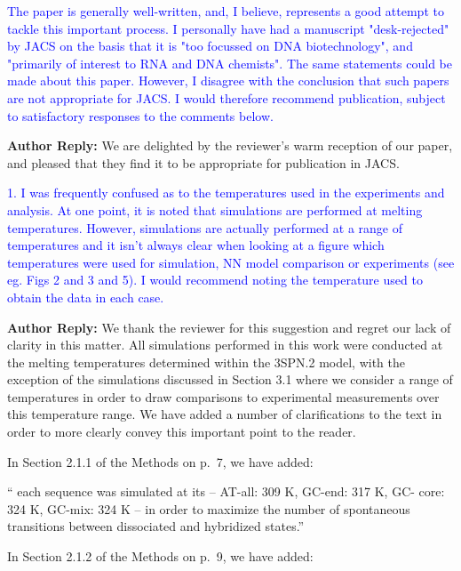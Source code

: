 \documentclass[11pt,a4paper]{letter} %
\newcommand*{\rood}[1]{{\color{red}{#1}}}
\begin{document}
\textcolor{blue}{The paper is generally well-written, and, I believe, represents a good attempt to tackle this important process. I personally have had a manuscript "desk-rejected" by JACS on the basis that it is "too focussed on DNA biotechnology", and "primarily of interest to RNA and DNA chemists". The same statements could be made about this paper. However, I disagree with the conclusion that such papers are not appropriate for JACS. I would therefore recommend publication, subject to satisfactory responses to the comments below.  }

\textbf{Author Reply:}   We are delighted by the reviewer's warm reception of our paper, and pleased that they find it to be appropriate for publication in JACS.



\textcolor{blue}{1.   I was frequently confused as to the temperatures used in the experiments and analysis. At one point, it is noted that simulations are performed at melting temperatures. However, simulations are actually performed at a range of temperatures and it isn't always clear when looking at a figure which temperatures were used for simulation, NN model comparison or experiments (see eg. Figs 2 and 3 and 5). I would recommend noting the temperature used to obtain the data in each case.}

\textbf{Author Reply:}   We thank the reviewer for this suggestion and regret our lack of clarity in this matter. All simulations performed in this work were conducted at the melting temperatures determined within the 3SPN.2 model, with the exception of the simulations discussed in Section 3.1 where we consider a range of temperatures in order to draw comparisons to experimental measurements over this temperature range. We have added a number of clarifications to the text in order to more clearly convey this important point to the reader.

In Section 2.1.1 of the Methods on p.~7, we have added:

``\rood{With the exception of the simulation data reported in Section 3.1 where we draw comparisons against experimental data collected over a range of temperatures,} each sequence was simulated at its \rood{respective melting temperature dictated by the 3SPN.2 model} -- AT-all: 309 K, GC-end: 317 K, GC- core: 324 K, GC-mix: 324 K -- in order to maximize the number of spontaneous transitions between dissociated and hybridized states.''

In Section 2.1.2 of the Methods on p.~9, we have added:
\end{document}
